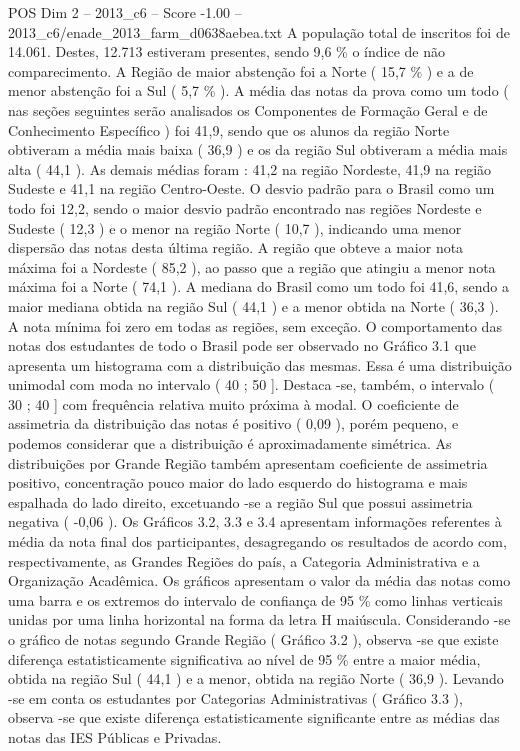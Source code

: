 \begin{textsample}{POS Dim 2 – 2013\_c6 – Score -1.00 – 2013\_c6/enade\_2013\_farm\_d0638aebea.txt}
A população total de inscritos foi de 14.061.
Destes, 12.713 estiveram presentes, sendo 9,6 \% o índice de não comparecimento.
A Região de maior abstenção foi a Norte ( 15,7 \% ) e a de menor abstenção foi a Sul ( 5,7 \% ).
A média das notas da prova como um todo ( nas seções seguintes serão analisados os Componentes de Formação Geral e de Conhecimento Específico ) foi 41,9, sendo que os alunos da região Norte obtiveram a média mais baixa ( 36,9 ) e os da região Sul obtiveram a média mais alta ( 44,1 ).
As demais médias foram : 41,2 na região Nordeste, 41,9 na região Sudeste e 41,1 na região Centro-Oeste.
O desvio padrão para o Brasil como um todo foi 12,2, sendo o maior desvio padrão encontrado nas regiões Nordeste e Sudeste ( 12,3 ) e o menor na região Norte ( 10,7 ), indicando uma menor dispersão das notas desta última região.
A região que obteve a maior nota máxima foi a Nordeste ( 85,2 ), ao passo que a região que atingiu a menor nota máxima foi a Norte ( 74,1 ).
A mediana do Brasil como um todo foi 41,6, sendo a maior mediana obtida na região Sul ( 44,1 ) e a menor obtida na Norte ( 36,3 ).
A nota mínima foi zero em todas as regiões, sem exceção.
O comportamento das notas dos estudantes de todo o Brasil pode ser observado no Gráfico 3.1 que apresenta um histograma com a distribuição das mesmas.
Essa é uma distribuição unimodal com moda no intervalo ( 40 ; 50 ].
Destaca -se, também, o intervalo ( 30 ; 40 ] com frequência relativa muito próxima à modal.
O coeficiente de assimetria da distribuição das notas é positivo ( 0,09 ), porém pequeno, e podemos considerar que a distribuição é aproximadamente simétrica.
As distribuições por Grande Região também apresentam coeficiente de assimetria positivo, concentração pouco maior do lado esquerdo do histograma e mais espalhada do lado direito, excetuando -se a região Sul que possui assimetria negativa ( -0,06 ).
Os Gráficos 3.2, 3.3 e 3.4 apresentam informações referentes à média da nota final dos participantes, desagregando os resultados de acordo com, respectivamente, as Grandes Regiões do país, a Categoria Administrativa e a Organização Acadêmica.
Os gráficos apresentam o valor da média das notas como uma barra e os extremos do intervalo de confiança de 95 \% como linhas verticais unidas por uma linha horizontal na forma da letra H maiúscula.
Considerando -se o gráfico de notas segundo Grande Região ( Gráfico 3.2 ), observa -se que existe diferença estatisticamente significativa ao nível de 95 \% entre a maior média, obtida na região Sul ( 44,1 ) e a menor, obtida na região Norte ( 36,9 ).
Levando -se em conta os estudantes por Categorias Administrativas ( Gráfico 3.3 ), observa -se que existe diferença estatisticamente significante entre as médias das notas das IES Públicas e Privadas.

\end{textsample}

